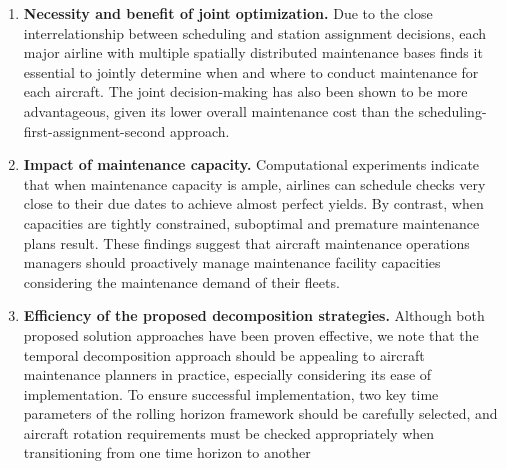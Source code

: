 \begin{enumerate}
    \item \textbf{Necessity and benefit of joint optimization.} Due to the close interrelationship between scheduling and station assignment decisions, each major airline with multiple spatially distributed maintenance bases finds it essential to jointly determine when and where to conduct maintenance for each aircraft. The joint decision-making has also been shown to be more advantageous, given its lower overall maintenance cost than the scheduling-first-assignment-second approach.
    \item \textbf{Impact of maintenance capacity.} Computational experiments indicate that when maintenance capacity is ample, airlines can schedule checks very close to their due dates to achieve almost perfect yields. By contrast, when capacities are tightly constrained, suboptimal and premature maintenance plans result. These findings suggest that aircraft maintenance operations managers should proactively manage maintenance facility capacities considering the maintenance demand of their fleets. 
    \item \textbf{Efficiency of the proposed decomposition strategies.} Although both proposed solution approaches have been proven effective, we note that the temporal decomposition approach should be appealing to aircraft maintenance planners in practice, especially considering its ease of implementation. To ensure successful implementation, two key time parameters of the rolling horizon framework should be carefully selected, and aircraft rotation requirements must be checked appropriately when transitioning from one time horizon to another
\end{enumerate}

\color{black}

